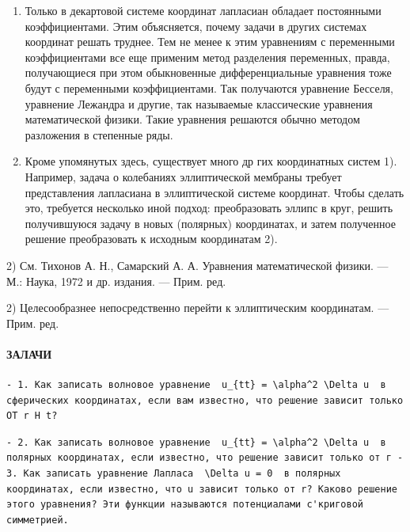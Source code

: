 \documentclass[
  ukrainian,
]{article}
\begin{document}
\begin{enumerate}
\def\labelenumi{\arabic{enumi}.}
\item
  Только в декартовой системе координат лапласиан обладает постоянными
  коэффициентами. Этим объясняется, почему задачи в других системах
  координат решать труднее. Тем не менее к этим уравнениям с переменными
  коэффициентами все еще применим метод разделения переменных, правда,
  получающиеся при этом обыкновенные дифференциальные уравнения тоже
  будут с переменными коэффициентами. Так получаются уравнение Бесселя,
  уравнение Лежандра и другие, так называемые классические уравнения
  математической физики. Такие уравнения решаются обычно методом
  разложения в степенные ряды.
\item
  Кроме упомянутых здесь, существует много др гих координатных систем
  1). Например, задача о колебаниях эллиптической мембраны требует
  представления лапласиана в эллиптической системе координат. Чтобы
  сделать это, требуется несколько иной подход: преобразовать эллипс в
  круг, решить получившуюся задачу в новых (полярных) координатах, и
  затем полученное решение преобразовать к исходным координатам 2).
\end{enumerate}

2) См. Тихонов А. Н., Самарский А. А. Уравнения математической физики.
--- М.: Наука, 1972 и др. издания. --- Прим. ред.

2) Целесообразнее непосредственно перейти к эллиптическим координатам.
--- Прим. ред.

\paragraph{ЗАЛАЧИ}\label{ux437ux430ux43bux430ux447ux438}

\begin{verbatim}
- 1. Как записать волновое уравнение  u_{tt} = \alpha^2 \Delta u  в сферических координатах, если вам известно, что решение зависит только OT r H t?
\end{verbatim}

\begin{verbatim}
- 2. Как записать волновое уравнение  u_{tt} = \alpha^2 \Delta u  в полярных координатах, если известно, что решение зависит только от г - 3. Как записать уравнение Лапласа  \Delta u = 0  в полярных координатах, если известно, что u зависит только от r? Каково решение этого уравнения? Эти функции называются потенциалами с'криговой симметрией.
\end{verbatim}
\end{document}
